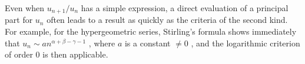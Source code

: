 Even when \(u_{n+1} / u_n\) has a simple expression, a direct evaluation of a principal part for \(u_n\) often leads to a result as quickly as the criteria of the second kind. For example, for the hypergeometric series, Stirling's formula shows immediately that \(u_n \sim a n^{\alpha + \beta - \gamma - 1}\) , where \(a\) is a constant \(\neq 0\) , and the logarithmic criterion of order 0 is then applicable.

\appendix
\renewcommand{\thechapter}{}
\renewcommand{\thesection}{\arabic{section}}
